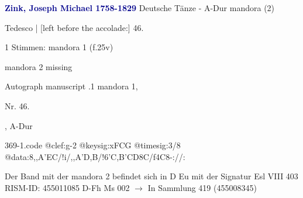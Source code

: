 \documentclass[twocolumn]{book}
\begin{document}
\newline \par \vspace{7pt} \textcolor{darkblue}{\textbf{Zink, Joseph Michael  1758-1829}}
\newline Deutsche Tänze - A-Dur
\newline mandora (2)
\newline \begin{itshape}[f.25v, at left:] Tedesco | [left before the accolade:] 46.\end{itshape} 
\newline \textcolor{darkblue}{}  1 Stimmen: mandora 1  (f.25v)
\newline \begin{small} mandora 2 missing\end{small} 
\newline Autograph manuscript
.1  mandora 1, \begin{itshape}Nr. 46.\end{itshape}, A-Dur  
\begin{filecontents*}{369-1.code}
@clef:g-2
@keysig:xFCG
@timesig:3/8
@data:8,,A'EC/!i/,,A'D,B/!{6'C,B'CD}8C/f4C8-://:
\end{filecontents*}
\newline
%
\newline Der Band mit der mandora 2 befindet sich in D Eu mit der Signatur Esl VIII 403
\newline RISM-ID: 455011085
\newline D-Fh  Ms 002
\newline $\rightarrow$ In Sammlung 419 (455008345)
      
\end{document}
